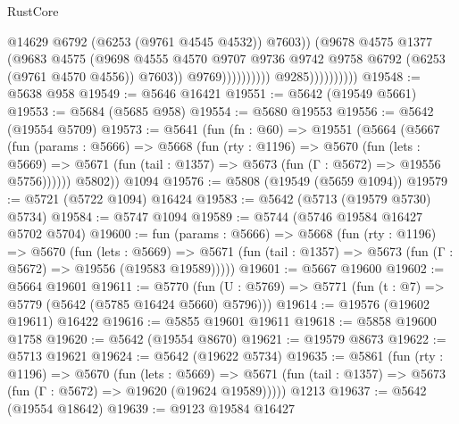 \begin{lexlean}{RustCore}
\begin{coremodule}
                                              @14629
                                              @6792
                                              (@6253 (@9761 @4545 @4532))
                                              @7603))
                                          (@9678
                                            @4575
                                            @1377
                                            (@9683
                                              @4575
                                              (@9698
                                                @4555
                                                @4570
                                                @9707
                                                @9736
                                                @9742
                                                @9758
                                                @6792
                                                (@6253 (@9761 @4570 @4556))
                                                @7603))
                                            @9769))))))))))
                        @9285))))))))))
@19548 := @5638 @958
@19549 := @5646 @16421
@19551 := @5642 (@19549 @5661)
@19553 := @5684 (@5685 @958)
@19554 := @5680 @19553
@19556 := @5642 (@19554 @5709)
@19573 := @5641
    (fun (fn : @60) =>
    @19551
      (@5664
        (@5667
          (fun (params : @5666) =>
          @5668
            (fun (rty : @1196) =>
            @5670
              (fun (lets : @5669) =>
              @5671 (fun (tail : @1357) => @5673 (fun (Γ : @5672) => @19556 @5756))))))
        @5802))
    @1094
@19576 := @5808 (@19549 (@5659 @1094))
@19579 := @5721 (@5722 @1094) @16424
@19583 := @5642 (@5713 (@19579 @5730) @5734)
@19584 := @5747 @1094
@19589 := @5744 (@5746 @19584 @16427 @5702 @5704)
@19600 := fun (params : @5666) =>
  @5668
    (fun (rty : @1196) =>
    @5670
      (fun (lets : @5669) =>
      @5671 (fun (tail : @1357) => @5673 (fun (Γ : @5672) => @19556 (@19583 @19589)))))
@19601 := @5667 @19600
@19602 := @5664 @19601
@19611 := @5770
    (fun (U : @5769) => @5771 (fun (t : @7) => @5779 (@5642 (@5785 @16424 @5660) @5796)))
@19614 := @19576 (@19602 @19611) @16422
@19616 := @5855 @19601 @19611
@19618 := @5858 @19600 @1758
@19620 := @5642 (@19554 @8670)
@19621 := @19579 @8673
@19622 := @5713 @19621
@19624 := @5642 (@19622 @5734)
@19635 := @5861
    (fun (rty : @1196) =>
    @5670
      (fun (lets : @5669) =>
      @5671 (fun (tail : @1357) => @5673 (fun (Γ : @5672) => @19620 (@19624 @19589)))))
    @1213
@19637 := @5642 (@19554 @18642)
@19639 := @9123 @19584 @16427

\end{coremodule}
\end{lexlean}
